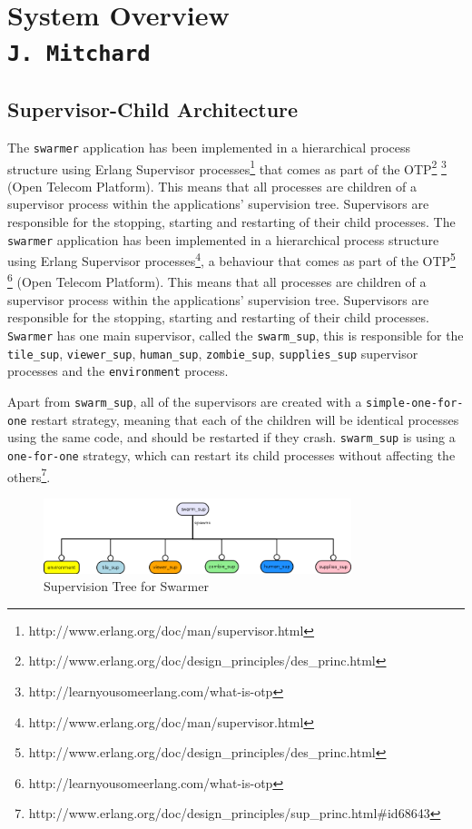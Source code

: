 \pagestyle{empty}
\section{System Overview\\{\small\tt J.~Mitchard}}
\label{system_overview}
\subsection{Supervisor-Child Architecture}
\label{otp_description}
The \verb+swarmer+ application has been implemented in a hierarchical process structure using Erlang Supervisor processes\footnote{http://www.erlang.org/doc/man/supervisor.html} that comes as part of the OTP\footnote{http://www.erlang.org/doc/design\_principles/des\_princ.html} \footnote{http://learnyousomeerlang.com/what-is-otp} (Open Telecom Platform). This means that all processes are children of a supervisor process within the applications' supervision tree. Supervisors are responsible for the stopping, starting and restarting of their child processes.
%
\label{supervisor_arch}
The \verb+swarmer+ application has been implemented in a hierarchical process structure using Erlang Supervisor processes\footnote{http://www.erlang.org/doc/man/supervisor.html}, a behaviour that comes as part of the OTP\footnote{http://www.erlang.org/doc/design\_principles/des\_princ.html} \footnote{http://learnyousomeerlang.com/what-is-otp} (Open Telecom Platform). This means that all processes are children of a supervisor process within the applications' supervision tree. Supervisors are responsible for the stopping, starting and restarting of their child processes.
\verb+Swarmer+ has one main supervisor, called the \verb+swarm_sup+, this is responsible for the \verb+tile_sup+, \verb+viewer_sup+, \verb+human_sup+, \verb+zombie_sup+, \verb+supplies_sup+ supervisor processes and the \verb+environment+ process.

Apart from \verb+swarm_sup+, all of the supervisors are created with a \verb+simple-one-for-one+ restart strategy, meaning that each of the children will be identical processes using the same code, and should be restarted if they crash. \verb+swarm_sup+ is using a \verb+one-for-one+ strategy, which can restart its child processes without affecting the others\footnote{http://www.erlang.org/doc/design\_principles/sup\_princ.html\#id68643}.

\begin{figure}[h]
  \centering
  \includegraphics[width=0.8\textwidth]{img/supervisor.png}
\caption{Supervision Tree for Swarmer}
    \label{fig:sup_tree}
\end{figure}

